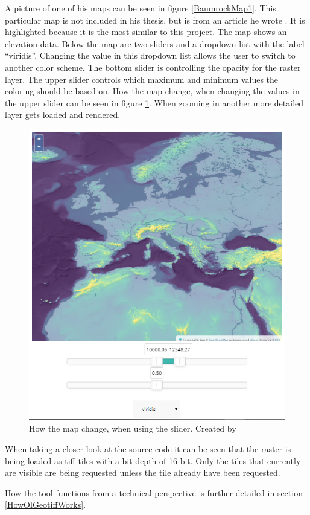A picture of one of his maps can be seen in figure \ref{BaumrockMap1}. This particular map is not included in his thesis, but is from an article he wrote \citep{EOX}.
It is highlighted because it is the most similar to this project. The map shows an elevation data. Below the map are two sliders and a dropdown list with the label “viridis”. Changing the value in this dropdown list allows the user to switch to another color scheme. The bottom slider is controlling the opacity for the raster layer. The upper slider controls which maximum and minimum values the coloring should be based on. How the map change, when changing the values in the upper slider can be seen in figure \ref{BaumrockMap2}. When zooming in another more detailed layer gets loaded and rendered.
\begin{figure} [H]
	\centering
	\includegraphics[width=.6\textwidth]{Pictures/BaumrockMap2}
	\caption{How the map change, when using the slider. Created by \citep{EOX}}
	\label{BaumrockMap2}
\end{figure}

When taking a closer look at the source code it can be seen that the raster is being loaded as tiff tiles with a bit depth of 16 bit. \citep{EOX} Only the tiles that currently are visible are being requested unless the tile already have been requested. \citep{Baumrocks}

How the tool functions from a technical perspective is further detailed in section \ref{HowOlGeotiffWorks}.
